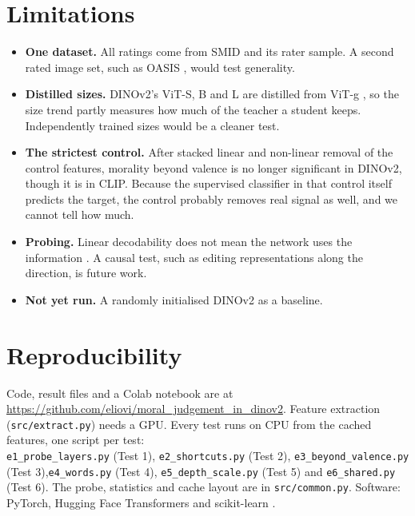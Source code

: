 \documentclass[11pt]{article}
\begin{document}
\section{Limitations}\label{sec:limits}
\begin{itemize}
\item \textbf{One dataset.} All ratings come from SMID and its rater sample. A second rated image set, such as OASIS \cite{kurdi2017}, would test generality.
\item \textbf{Distilled sizes.} DINOv2's ViT-S, B and L are distilled from ViT-g \cite{oquab2023}, so the size trend partly measures how much of the teacher a student keeps. Independently trained sizes would be a cleaner test.
\item \textbf{The strictest control.} After stacked linear and non-linear removal of the control features, morality beyond valence is no longer significant in DINOv2, though it is in CLIP. Because the supervised classifier in that control itself predicts the target, the control probably removes real signal as well, and we cannot tell how much.
\item \textbf{Probing.} Linear decodability does not mean the network uses the information \cite{belinkov2022,hewitt2019}. A causal test, such as editing representations along the direction, is future work.
\item \textbf{Not yet run.} A randomly initialised DINOv2 as a baseline.
\end{itemize}

\section{Reproducibility}
Code, result files and a Colab notebook are at \url{https://github.com/eliovi/moral_judgement_in_dinov2}. Feature extraction (\texttt{src/extract.py}) needs a GPU. Every test runs on CPU from the cached features, one script per test:\\ \texttt{e1\_probe\_layers.py} (Test 1), \texttt{e2\_shortcuts.py} (Test 2), \texttt{e3\_beyond\_valence.py} (Test 3),\linebreak \texttt{e4\_words.py} (Test 4), \texttt{e5\_depth\_scale.py} (Test 5) and \texttt{e6\_shared.py} (Test 6). The probe, statistics and cache layout are in \texttt{src/common.py}. Software: PyTorch, Hugging Face Transformers and scikit-learn \cite{pedregosa2011}.
\end{document}
